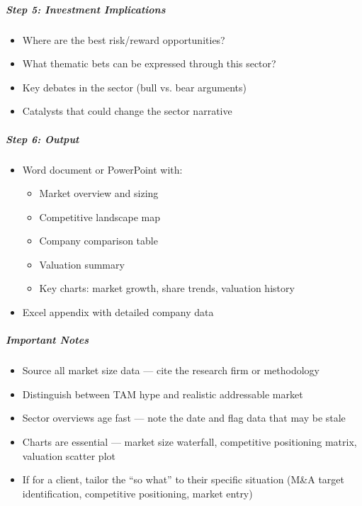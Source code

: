 \documentclass[11pt]{article}
\begin{document}
\subparagraph{Step 5: Investment Implications}\mbox{}\par

\begin{itemize}[leftmargin=*,itemsep=2pt,topsep=2pt]
\item {} Where are the best risk/reward opportunities?
\item {} What thematic bets can be expressed through this sector?
\item {} Key debates in the sector (bull vs. bear arguments)
\item {} Catalysts that could change the sector narrative
\end{itemize}

\subparagraph{Step 6: Output}\mbox{}\par

\begin{itemize}[leftmargin=*,itemsep=2pt,topsep=2pt]
\item {} Word document or PowerPoint with:
\begin{itemize}[leftmargin=*,itemsep=2pt,topsep=2pt]
\item {} Market overview and sizing
\item {} Competitive landscape map
\item {} Company comparison table
\item {} Valuation summary
\item {} Key charts: market growth, share trends, valuation history
\end{itemize}
\item {} Excel appendix with detailed company data
\end{itemize}

\subparagraph{Important Notes}\mbox{}\par

\begin{itemize}[leftmargin=*,itemsep=2pt,topsep=2pt]
\item {} Source all market size data — cite the research firm or methodology
\item {} Distinguish between TAM hype and realistic addressable market
\item {} Sector overviews age fast — note the date and flag data that may be stale
\item {} Charts are essential — market size waterfall, competitive positioning matrix, valuation scatter plot
\item {} If for a client, tailor the ``so what'' to their specific situation (M\&A target identification, competitive positioning, market entry)
\end{itemize}
\end{document}
